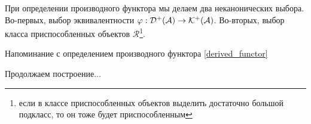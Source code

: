 \documentclass[../main.tex]{subfiles}
\begin{document}
\eee
\begin{to_com}
При определении производного функтора мы делаем два неканонических  выбора. Во-первых, выбор эквивалентности $\varphi: \mathcal{D^+(A)} \rightarrow \mathcal{K^+(A)}$. Во-вторых, выбор класса приспособленных объектов $\mathcal{R}$\footnote{если в классе приспособленных объектов выделить достаточно большой подкласс, то он тоже будет приспособленным}.
\end{to_com}
Напоминание с определением производного функтора \ref{derived_functor}
\bee
{}
\eee
\bee
{}
\eee
Продолжаем построение...
\end{document}
